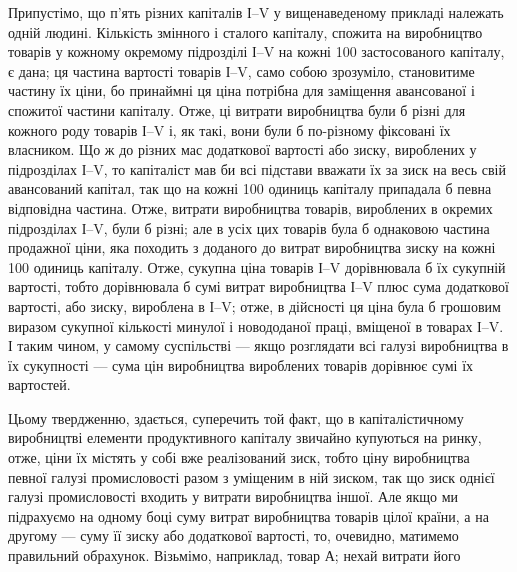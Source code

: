 Припустімо, що п’ять різних капіталів І--V у вищенаведеному прикладі належать одній людині. Кількість
змінного і сталого капіталу, спожита на виробництво товарів у кожному окремому підрозділі І--V на
кожні 100 застосованого капіталу,
є дана; ця частина вартості товарів І--V, само собою зрозуміло, становитиме частину їх ціни, бо
принаймні ця ціна потрібна для заміщення авансованої і спожитої частини капіталу. Отже, ці витрати
виробництва були б різні для кожного роду
товарів І--V і, як такі, вони були б по-різному фіксовані їх власником. Що ж до різних мас додаткової
вартості або зиску, вироблених у підрозділах І--V, то капіталіст мав би всі підстави вважати їх за
зиск на весь свій авансований капітал, так що
на кожні 100 одиниць капіталу припадала б певна відповідна
частина. Отже, витрати виробництва товарів, вироблених в окремих підрозділах І--V, були б різні; але
в усіх цих товарів
була б однаковою частина продажної ціни, яка походить з доданого до витрат виробництва зиску на
кожні 100 одиниць капіталу. Отже, сукупна ціна товарів І--V дорівнювала б їх сукупній вартості, тобто
дорівнювала б сумі витрат виробництва
І--V плюс сума додаткової вартості, або зиску, вироблена в
І--V; отже, в дійсності ця ціна була б грошовим виразом сукупної кількості минулої і новододаної
праці, вміщеної в товарах
І--V. І таким чином, у самому суспільстві — якщо розглядати
всі галузі виробництва в їх сукупності — сума цін виробництва
вироблених товарів дорівнює сумі їх вартостей.

Цьому твердженню, здається, суперечить той факт, що в
капіталістичному виробництві елементи продуктивного капіталу
звичайно купуються на ринку, отже, ціни їх містять у собі вже
реалізований зиск, тобто ціну виробництва певної галузі промисловості разом з уміщеним в ній зиском,
так що зиск однієї
галузі промисловості входить у витрати виробництва іншої.
Але якщо ми підрахуємо на одному боці суму витрат виробництва товарів цілої країни, а на другому —
суму її зиску або додаткової вартості, то, очевидно, матимемо правильний обрахунок. Візьмімо,
наприклад, товар $А$; нехай витрати його
\parbreak{}  %
